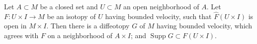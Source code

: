 Let $A \subset M$ be a closed set and $U \subset M$ an open neighborhood of $A$. Let $F: U \times I \to M$ be an isotopy of $U$ having bounded velocity, such that $\hat{F}(U \times I)$ is open in $M \times I$. Then there is a diffeotopy $G$ of $M$ having bounded velocity, which agrees with $F$ on a neighborhood of $A \times I$; and $\operatorname{Supp} G \subset F(U \times I)$.
